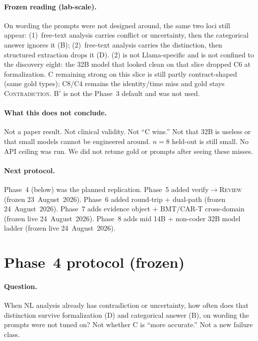 \documentclass[11pt,a4paper]{article}
\newcommand{\con}{\textsc{Contradiction}}
\newcommand{\rev}{\textsc{Review}}
\begin{document}
\paragraph{Frozen reading (lab-scale).}
On wording the prompts were not designed around, the same two loci still appear:
(1)~free-text analysis carries conflict or uncertainty, then the categorical answer ignores it (B);
(2)~free-text analysis carries the distinction, then structured extraction drops it (D).
(2) is not Llama-specific and is not confined to the discovery eight: the 32B model that looked clean on that slice dropped C6 at formalization.
C remaining strong on this slice is still partly contract-shaped (same gold types); C8/C4 remains the identity/time miss and gold stays \con{}.
B$'$ is not the Phase~3 default and was not used.

\paragraph{What this does not conclude.}
Not a paper result. Not clinical validity. Not ``C wins.'' Not that 32B is useless or that small models cannot be engineered around.
$n=8$ held-out is still small. No API ceiling was run.
We did not retune gold or prompts after seeing these misses.

\paragraph{Next protocol.}
Phase~4 (below) was the planned replication. Phase~5 added verify$\rightarrow$\rev{} (frozen 23~August~2026).
Phase~6 added round-trip + dual-path (frozen 24~August~2026).
Phase~7 adds evidence object + BMT/CAR-T cross-domain (frozen live 24~August~2026).
Phase~8 adds mid 14B + non-coder 32B model ladder (frozen live 24~August~2026).

\section{Phase~4 protocol (frozen)}
\label{sec:phase4-protocol}

\paragraph{Question.}
When NL analysis already has contradiction or uncertainty, how often does that distinction survive formalization (D) and categorical answer (B), on wording the prompts were not tuned on?
Not whether C is ``more accurate.'' Not a new failure class.
\end{document}
